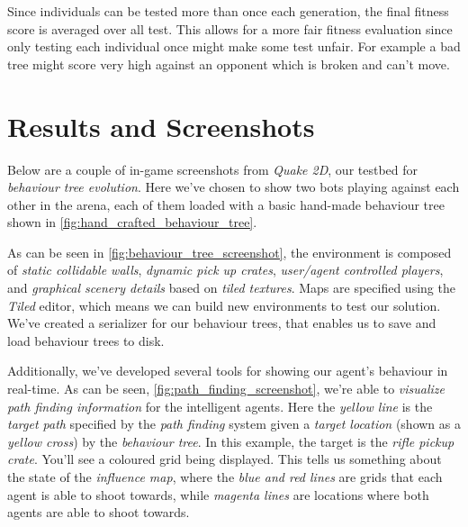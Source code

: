 \documentclass[a4paper, twocolumn]{article}
\begin{document}
        Since individuals can be tested more than once each generation, the final fitness score is averaged over all test. This allows for a more fair fitness evaluation since only testing each individual once might make some test unfair. For example a bad tree might score very high against an opponent which is broken and can't move.

    \section{Results and Screenshots} \label{sec:results_and_screenshots}

        Below are a couple of in-game screenshots from \emph{Quake 2D}, our testbed for \emph{behaviour tree evolution}. Here we've chosen to show two bots playing against each other in the arena, each of them loaded with a basic hand-made behaviour tree shown in \cref{fig:hand_crafted_behaviour_tree}.

        As can be seen in \cref{fig:behaviour_tree_screenshot}, the environment is composed of \emph{static collidable walls}, \emph{dynamic pick up crates}, \emph{user/agent controlled players}, and \emph{graphical scenery details} based on \emph{tiled textures}. Maps are specified using the \emph{Tiled} editor, which means we can build new environments to test our solution. We've created a serializer for our behaviour trees, that enables us to save and load behaviour trees to disk.

        Additionally, we've developed several tools for showing our agent's behaviour in real-time. As can be seen, \cref{fig:path_finding_screenshot}, we're able to \emph{visualize path finding information} for the intelligent agents. Here the \emph{yellow line} is the \emph{target path} specified by the \emph{path finding} system given a \emph{target location} (shown as a \emph{yellow cross}) by the \emph{behaviour tree}. In this example, the target is the \emph{rifle pickup crate}. You'll see a coloured grid being displayed. This tells us something about the state of the \emph{influence map}, where the \emph{blue and red lines} are grids that each agent is able to shoot towards, while \emph{magenta lines} are locations where both agents are able to shoot towards.
\end{document}
